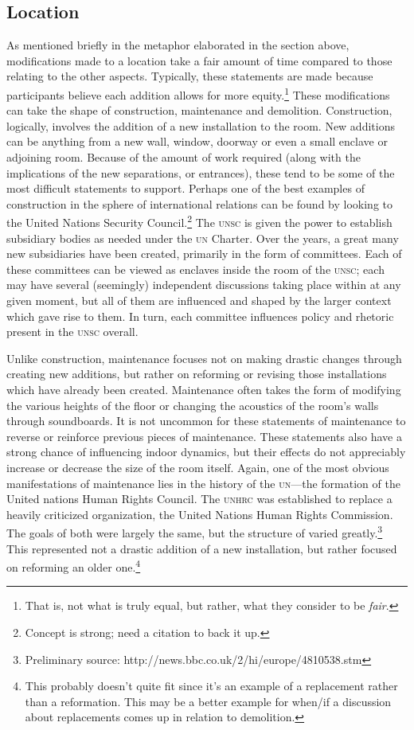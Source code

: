 \documentclass{article}
\begin{document}
\subsection{Location}
As mentioned briefly in the metaphor elaborated in the section above, modifications made to a location take a fair amount of time compared to those relating to the other aspects.
Typically, these statements are made because participants believe each addition allows for more equity.\footnote{That is, not what is truly equal, but rather, what they consider to be \emph{fair}.}
These modifications can take the shape of construction, maintenance and demolition.
Construction, logically, involves the addition of a new installation to the room.
New additions can be anything from a new wall, window, doorway or even a small enclave or adjoining room.
Because of the amount of work required (along with the implications of the new separations, or entrances), these tend to be some of the most difficult statements to support.
Perhaps one of the best examples of construction in the sphere of international relations can be found by looking to the United Nations Security Council.\footnote{Concept is strong; need a citation to back it up.}
The \textsc{unsc} is given the power to establish subsidiary bodies as needed under the \textsc{un} Charter.
Over the years, a great many new subsidiaries have been created, primarily in the form of committees.
Each of these committees can be viewed as enclaves inside the room of the \textsc{unsc}; each may have several (seemingly) independent discussions taking place within at any given moment, but all of them are influenced and shaped by the larger context which gave rise to them.
In turn, each committee influences policy and rhetoric present in the \textsc{unsc} overall.

Unlike construction, maintenance focuses not on making drastic changes through creating new additions, but rather on reforming or revising those installations which have already been created.
Maintenance often takes the form of modifying the various heights of the floor or changing the acoustics of the room's walls through soundboards.
It is not uncommon for these statements of maintenance to reverse or reinforce previous pieces of maintenance.
These statements also have a strong chance of influencing indoor dynamics, but their effects do not appreciably increase or decrease the size of the room itself.
Again, one of the most obvious manifestations of maintenance lies in the history of the \textsc{un}---the formation of the United nations Human Rights Council.
The \textsc{unhrc} was established to replace a heavily criticized organization, the United Nations Human Rights Commission.
The goals of both were largely the same, but the structure of varied greatly.\footnote{Preliminary source: http://news.bbc.co.uk/2/hi/europe/4810538.stm}
This represented not a drastic addition of a new installation, but rather focused on reforming an older one.\footnote{This probably doesn't quite fit since it's an example of a replacement rather than a reformation. This may be a better example for when/if a discussion about replacements comes up in relation to demolition.}
\end{document}

